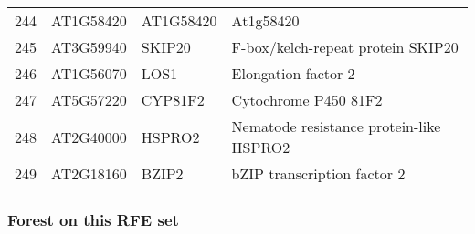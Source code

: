\documentclass[a4paper]{article}
\begin{document}
\begin{center}
\begin{tabular}{rlll}
244 & AT1G58420 & AT1G58420 & At1g58420\\
245 & AT3G59940 & SKIP20 & F-box/kelch-repeat protein SKIP20\\
246 & AT1G56070 & LOS1 & Elongation factor 2\\
247 & AT5G57220 & CYP81F2 & Cytochrome P450 81F2\\
248 & AT2G40000 & HSPRO2 & Nematode resistance protein-like HSPRO2\\
249 & AT2G18160 & BZIP2 & bZIP transcription factor 2\\
\end{tabular}
\end{center}


\subsubsection{Forest on this RFE set}
\label{sec:org0a6e6cd}
\end{document}
